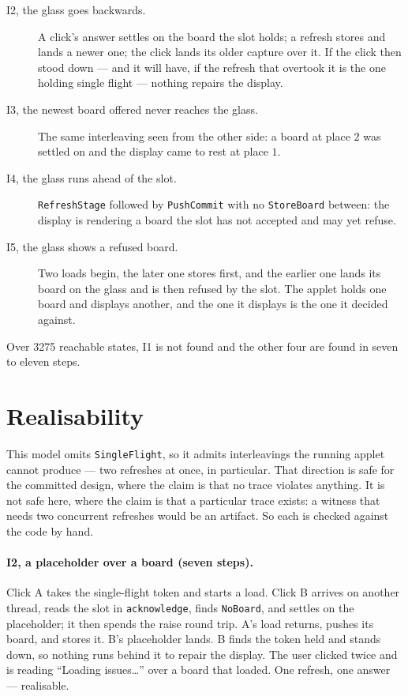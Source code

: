 \documentclass[a4paper,10pt,fleqn]{article}
\begin{document}
\begin{description}
  \item[I2, the glass goes backwards.] A click's answer settles on the board the
    slot holds; a refresh stores and lands a newer one; the click lands its
    older capture over it. If the click then stood down --- and it will have, if
    the refresh that overtook it is the one holding single flight --- nothing
    repairs the display.
  \item[I3, the newest board offered never reaches the glass.] The same
    interleaving seen from the other side: a board at place $2$ was settled on
    and the display came to rest at place $1$.
  \item[I4, the glass runs ahead of the slot.] \texttt{RefreshStage} followed by
    \texttt{PushCommit} with no \texttt{StoreBoard} between: the display is
    rendering a board the slot has not accepted and may yet refuse.
  \item[I5, the glass shows a refused board.] Two loads begin, the later one
    stores first, and the earlier one lands its board on the glass and is then
    refused by the slot. The applet holds one board and displays another, and
    the one it displays is the one it decided against.
\end{description}

Over 3275 reachable states, I1 is not found and the other four are found in
seven to eleven steps.

\section{Realisability}

This model omits \texttt{SingleFlight}, so it admits interleavings the running
applet cannot produce --- two refreshes at once, in particular. That direction
is safe for the committed design, where the claim is that no trace violates
anything. It is not safe here, where the claim is that a particular trace
exists: a witness that needs two concurrent refreshes would be an artifact.
So each is checked against the code by hand.

\paragraph{I2, a placeholder over a board (seven steps).}
Click A takes the single-flight token and starts a load. Click B arrives on
another thread, reads the slot in \texttt{acknowledge}, finds \texttt{NoBoard},
and settles on the placeholder; it then spends the raise round trip. A's load
returns, pushes its board, and stores it. B's placeholder lands. B finds the
token held and stands down, so nothing runs behind it to repair the display.
The user clicked twice and is reading ``Loading issues\ldots'' over a board that
loaded. One refresh, one answer --- realisable.
\end{document}
